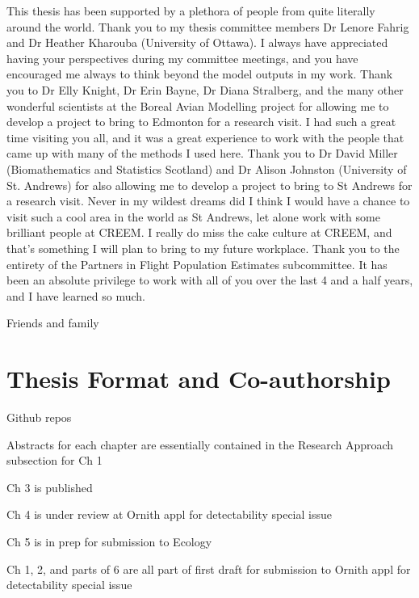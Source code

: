 \par This thesis has been supported by a plethora of people from quite literally around the world. 
Thank you to my thesis committee members Dr Lenore Fahrig and Dr Heather Kharouba (University of Ottawa).
I always have appreciated having your perspectives during my committee meetings, and you have encouraged me always to think beyond the model outputs in my work.
Thank you to Dr Elly Knight, Dr Erin Bayne, Dr Diana Stralberg, and the many other wonderful scientists at the Boreal Avian Modelling project for allowing me to develop a project to bring to Edmonton for a research visit.
I had such a great time visiting you all, and it was a great experience to work with the people that came up with many of the methods I used here.
Thank you to Dr David Miller (Biomathematics and Statistics Scotland) and Dr Alison Johnston (University of St. Andrews) for also allowing me to develop a project to bring to St Andrews for a research visit.
Never in my wildest dreams did I think I would have a chance to visit such a cool area in the world as St Andrews, let alone work with some brilliant people at CREEM.
I really do miss the cake culture at CREEM, and that's something I will plan to bring to my future workplace.
Thank you to the entirety of the Partners in Flight Population Estimates subcommittee.
It has been an absolute privilege to work with all of you over the last 4 and a half years, and I have learned so much.

\par Friends and family



\chapter*{Thesis Format and Co-authorship}


\par Github repos
\par Abstracts for each chapter are essentially contained in the Research Approach subsection for Ch 1
\par Ch 3 is published
\par Ch 4 is under review at Ornith appl for detectability special issue
\par Ch 5 is in prep for submission to Ecology
\par Ch 1, 2, and parts of 6 are all part of first draft for submission to Ornith appl for detectability special issue


\clearpage

\tableofcontents

\listoffigures

\listoftables


\label{endfrontmatter} %
